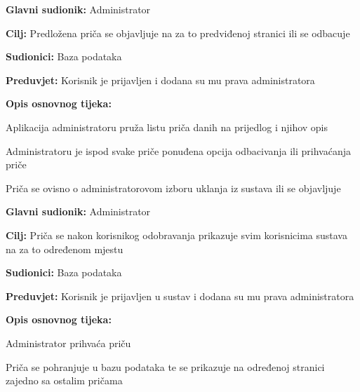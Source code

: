 					\noindent {}
				\begin{packed_item}
					
					\item \textbf{Glavni sudionik: }Administrator
					\item  \textbf{Cilj:} Predložena priča se objavljuje na za to predviđenoj stranici ili se odbacuje
					\item  \textbf{Sudionici:} Baza podataka
					\item  \textbf{Preduvjet:} Korisnik je prijavljen i dodana su mu prava administratora
					\item  \textbf{Opis osnovnog tijeka:}
					
					\item[] \begin{packed_enum}
						
						\item Aplikacija administratoru pruža listu priča danih na prijedlog i njihov opis
						\item Administratoru je ispod svake priče ponuđena opcija odbacivanja ili prihvaćanja priče
						\item Priča se ovisno o administratorovom izboru uklanja iz sustava ili se objavljuje
					\end{packed_enum}
				\end{packed_item}
			
					\noindent \underbar{\textbf{UC8 $-$ Objava priče}}
				\begin{packed_item}
					
					\item \textbf{Glavni sudionik: }Administrator
					\item  \textbf{Cilj:} Priča se nakon korisnikog odobravanja prikazuje svim korisnicima sustava na za to određenom mjestu
					\item  \textbf{Sudionici:} Baza podataka
					\item  \textbf{Preduvjet:} Korisnik je prijavljen u sustav i dodana su mu prava administratora
					\item  \textbf{Opis osnovnog tijeka:}
					
					\item[] \begin{packed_enum}
						
						\item Administrator prihvaća priču
						\item Priča se pohranjuje u bazu podataka te se prikazuje na određenoj stranici zajedno sa ostalim pričama
					\end{packed_enum}
				\end{packed_item}
				
